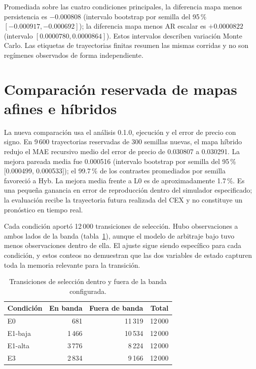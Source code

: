 Promediada sobre las cuatro condiciones principales, la diferencia mapa menos persistencia es $-0.000808$ (intervalo bootstrap por semilla del 95\,\% $[-0.000917,-0.000692]$); la diferencia mapa menos AR escalar es $+0.0000822$ (intervalo $[0.0000780,0.0000864]$). Estos intervalos describen variación Monte Carlo. Las etiquetas de trayectorias finitas resumen las mismas corridas y no son regímenes observados de forma independiente.

\section{Comparación reservada de mapas afines e híbridos}
\label{sec:hybrid-results}

La nueva comparación usa el análisis 0.1.0, ejecución \code{\HybridRunID} y el error de precio con signo. En 9\,600 trayectorias reservadas de 300 semillas nuevas, el mapa híbrido redujo el MAE recursivo medio del error de precio de 0.030807 a 0.030291. La mejora pareada media fue 0.000516 (intervalo bootstrap por semilla del 95\,\% [0.000499, 0.000533]); el 99.7\,\% de los contrastes promediados por semilla favoreció a Hyb. La mejora media frente a L0 es de aproximadamente 1.7\,\%. Es una pequeña ganancia en error de reproducción dentro del simulador especificado; la evaluación recibe la trayectoria futura realizada del CEX y no constituye un pronóstico en tiempo real.

Cada condición aportó 12\,000 transiciones de selección. Hubo observaciones a ambos lados de la banda (tabla~\ref{tab:hybrid-regimes}), aunque el modelo de arbitraje bajo tuvo menos observaciones dentro de ella. El ajuste sigue siendo específico para cada condición, y estos conteos no demuestran que las dos variables de estado capturen toda la memoria relevante para la transición.

\begin{table}[htbp]
\centering
\caption{Transiciones de selección dentro y fuera de la banda configurada.}
\label{tab:hybrid-regimes}
\small
\begin{tabular}{@{}lrrr@{}}
\toprule
Condición & En banda & Fuera de banda & Total \\
\midrule
E0 & 681 & 11\,319 & 12\,000 \\
E1-baja & 1\,466 & 10\,534 & 12\,000 \\
E1-alta & 3\,776 & 8\,224 & 12\,000 \\
E3 & 2\,834 & 9\,166 & 12\,000 \\
\bottomrule
\end{tabular}
\end{table}

